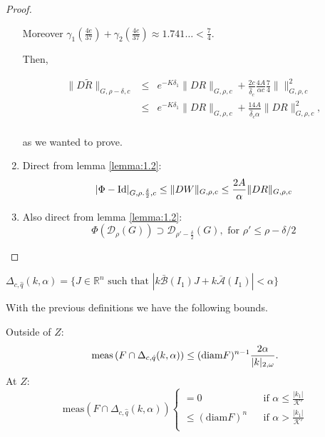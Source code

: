 \begin{proof}
\begin{enumerate}
Moreover $\gamma_1(\frac{4e}{37}) + \gamma_2(\frac{4e}{37}) \approx 1.741\ldots < \frac{7}{4}$.

Then,

$$\begin{array}{rcl}
\|D\tilde R\|_{G,\rho-\delta,c} & \leq & e^{-K\delta_1}\|DR\|_{G,\rho,c} + \frac{2c}{\hat\delta_c}\frac{4A}{\alpha c}\frac{7}{4}\|\|_{G,\rho,c}^2\\
 & \leq & e^{-K\delta_1}\|DR\|_{G,\rho,c} + \frac{14A}{\hat\delta_c\alpha}\|DR\|^2_{G,\rho,c},\\
\end{array}
$$

as we wanted to prove.

\item Direct from lemma \ref{lemma:1.2}:
$$|\Phi - \text{Id}|_{G,\rho.\frac{\delta}{2},c}\leq\|DW\|_{G,\rho,c}\leq\frac{2A}{\alpha}\|DR\|_{G,\rho,c}$$
\item Also direct from lemma \ref{lemma:1.2}:
$$\Phi(\mathcal{D}_\rho(G)) \supset \mathcal{D}_{\rho'-\frac{\delta}{2}}(G), \text{ for } \rho' \leq \rho - \delta/2$$
\end{enumerate}
\end{proof}


\begin{definition} $\Delta_{c,\hat q}(k,\alpha) = \{J \in \mathbb{R}^n \text{ such that } |k \bar{\mathcal{B}}(I_1) J + k \bar{\mathcal{A}}(I_1)| < \alpha\}$
\end{definition}

\begin{lemma}\label{lemma:mesure_resonances}With the previous definitions we have the following bounds.

Outside of $Z$:
$$\text{meas}\left(F \cap \Delta_{c,\hat q}(k,\alpha)\right) \leq (\textnormal{diam} F)^{n-1}\frac{2\alpha}{|k|_{2,\omega}}.$$
At $Z$:
$$\text{meas}\left(F \cap \Delta_{c,\hat q}(k,\alpha)\right)
\left\{
\begin{array}{lcl}
=0 & & \text{if } \alpha \leq \frac{|k_1|}{\mathcal{K}'}\\
\leq (\text{diam} F)^n & & \text{if } \alpha > \frac{|k_1|}{\mathcal{K}'} \\
\end{array}
\right.
$$
\end{lemma}

